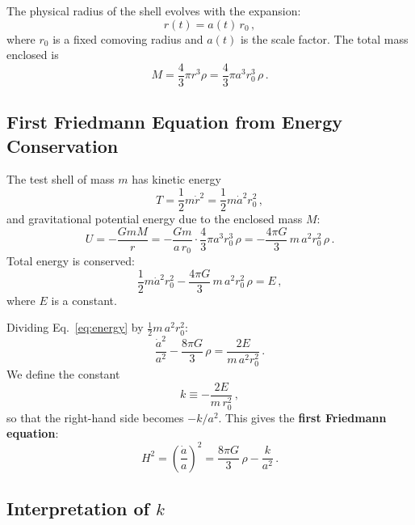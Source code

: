 The physical radius of the shell evolves with the expansion:
\begin{equation}\label{eq:comoving}
    r(t) = a(t)\,r_0\,,
\end{equation}
where $r_0$ is a fixed comoving radius and $a(t)$ is the scale factor. The total mass enclosed is
\begin{equation}\label{eq:mass}
    M = \frac{4}{3}\pi r^3\rho = \frac{4}{3}\pi a^3 r_0^3\,\rho\,.
\end{equation}

\subsection*{First Friedmann Equation from Energy Conservation}

The test shell of mass $m$ has kinetic energy
\begin{equation}
    T = \frac{1}{2}m\dot{r}^2 = \frac{1}{2}m\dot{a}^2 r_0^2\,,
\end{equation}
and gravitational potential energy due to the enclosed mass $M$:
\begin{equation}
    U = -\frac{GmM}{r} = -\frac{Gm}{a\,r_0}\cdot\frac{4}{3}\pi a^3 r_0^3\,\rho = -\frac{4\pi G}{3}\,m\,a^2 r_0^2\,\rho\,.
\end{equation}
Total energy is conserved:
\begin{equation}\label{eq:energy}
    \frac{1}{2}m\dot{a}^2 r_0^2 - \frac{4\pi G}{3}\,m\,a^2 r_0^2\,\rho = E\,,
\end{equation}
where $E$ is a constant.

Dividing Eq.~\eqref{eq:energy} by $\frac{1}{2}m\,a^2 r_0^2$:
\begin{equation}
    \frac{\dot{a}^2}{a^2} - \frac{8\pi G}{3}\,\rho = \frac{2E}{m\,a^2 r_0^2}\,.
\end{equation}
We define the constant
\begin{equation}
    k \equiv -\frac{2E}{m\,r_0^2}\,,
\end{equation}
so that the right-hand side becomes $-k/a^2$. This gives the \textbf{first Friedmann equation}:
\begin{equation}
\boxed{H^2 = \left(\frac{\dot{a}}{a}\right)^{\!2} = \frac{8\pi G}{3}\,\rho - \frac{k}{a^2}\,.}
\end{equation}

\subsection*{Interpretation of $k$}

